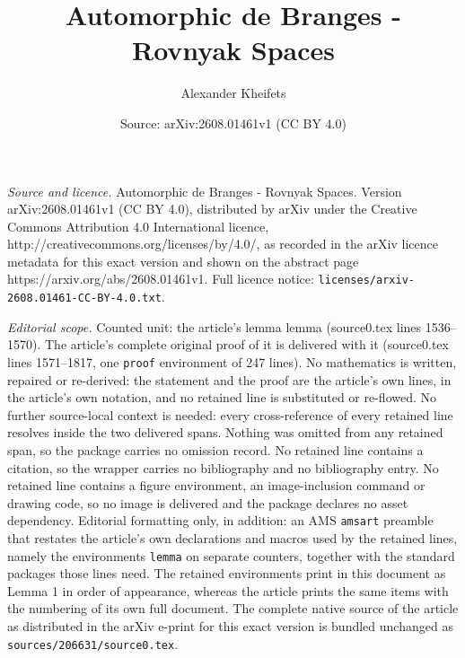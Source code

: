 \documentclass[10pt,a4paper]{amsart}
\title{Automorphic de Branges - Rovnyak Spaces}
\author{Alexander Kheifets}
\date{Source: arXiv:2608.01461v1 (CC BY 4.0)}
\begin{document}
\maketitle

\noindent\emph{Source and licence.} Automorphic de Branges - Rovnyak Spaces. Version arXiv:2608.01461v1 (CC BY 4.0), distributed by arXiv under the Creative Commons Attribution 4.0 International licence, http://creativecommons.org/licenses/by/4.0/, as recorded in the arXiv licence metadata for this exact version and shown on the abstract page https://arxiv.org/abs/2608.01461v1. Full licence notice: \texttt{licenses/arxiv-2608.01461-CC-BY-4.0.txt}.\par\smallskip

\noindent\textit{Editorial scope.} Counted unit: the article's lemma lemma (source0.tex lines 1536--1570). The article's complete original proof of it is delivered with it (source0.tex lines 1571--1817, one \texttt{proof} environment of 247 lines). No mathematics is written, repaired or re-derived: the statement and the proof are the article's own lines, in the article's own notation, and no retained line is substituted or re-flowed.  No further source-local context is needed: every cross-reference of every retained line resolves inside the two delivered spans.  Nothing was omitted from any retained span, so the package carries no omission record.  No retained line contains a citation, so the wrapper carries no bibliography and no bibliography entry.  No retained line contains a figure environment, an image-inclusion command or drawing code, so no image is delivered and the package declares no asset dependency.  Editorial formatting only, in addition: an AMS \texttt{amsart} preamble that restates the article's own declarations and macros used by the retained lines, namely the environments \texttt{lemma} on separate counters, together with the standard packages those lines need.  The retained environments print in this document as Lemma 1 in order of appearance, whereas the article prints the same items with the numbering of its own full document.  The complete native source of the article as distributed in the arXiv e-print for this exact version is bundled unchanged as \texttt{sources/206631/source0.tex}.
\end{document}

